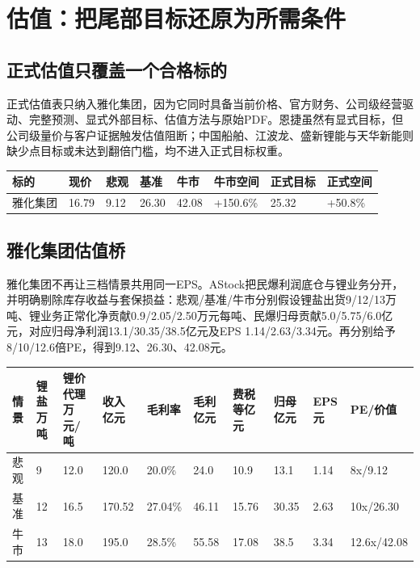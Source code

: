 \chapter{估值：把尾部目标还原为所需条件}

\section{正式估值只覆盖一个合格标的}

正式估值表只纳入雅化集团，因为它同时具备当前价格、官方财务、公司级经营驱动、完整预测、显式外部目标、估值方法与原始PDF。恩捷虽然有显式目标，但公司级量价与客户证据触发估值阻断；中国船舶、江波龙、盛新锂能与天华新能则缺少点目标或未达到翻倍门槛，均不进入正式目标权重。

\begin{exhibitbox}
\small
\begin{tabularx}{\exhibitboxwidth}{L{2.4cm} R{1.4cm} R{1.4cm} R{1.4cm} R{1.4cm} R{1.7cm} R{1.7cm} X}
\toprule
标的 & 现价 & 悲观 & 基准 & 牛市 & 牛市空间 & 正式目标 & 正式空间 \\
\midrule
雅化集团 & 16.79 & 9.12 & 26.30 & 42.08 & +150.6\% & 25.32 & +50.8\% \\
\bottomrule
\end{tabularx}
\end{exhibitbox}

\section{雅化集团估值桥}

雅化集团不再让三档情景共用同一EPS。AStock把民爆利润底仓与锂业务分开，并明确剔除库存收益与套保损益：悲观/基准/牛市分别假设锂盐出货9/12/13万吨、锂业务正常化净贡献0.9/2.05/2.50万元每吨、民爆归母贡献5.0/5.75/6.0亿元，对应归母净利润13.1/30.35/38.5亿元及EPS 1.14/2.63/3.34元。再分别给予8/10/12.6倍PE，得到9.12、26.30、42.08元。

\begin{exhibitbox}
\scriptsize
\begin{tabularx}{\exhibitboxwidth}{L{1.5cm} R{1.2cm} R{1.4cm} R{1.3cm} R{1.3cm} R{1.3cm} R{1.4cm} R{1.2cm} R{1.2cm} R{1.2cm}}
\toprule
情景 & 锂盐万吨 & 锂价代理万元/吨 & 收入亿元 & 毛利率 & 毛利亿元 & 费税等亿元 & 归母亿元 & EPS元 & PE/价值 \\
\midrule
悲观 & 9 & 12.0 & 120.0 & 20.0\% & 24.0 & 10.9 & 13.1 & 1.14 & 8x/9.12 \\
基准 & 12 & 16.5 & 170.52 & 27.04\% & 46.11 & 15.76 & 30.35 & 2.63 & 10x/26.30 \\
牛市 & 13 & 18.0 & 195.0 & 28.5\% & 55.58 & 17.08 & 38.5 & 3.34 & 12.6x/42.08 \\
\bottomrule
\end{tabularx}
\end{exhibitbox}

